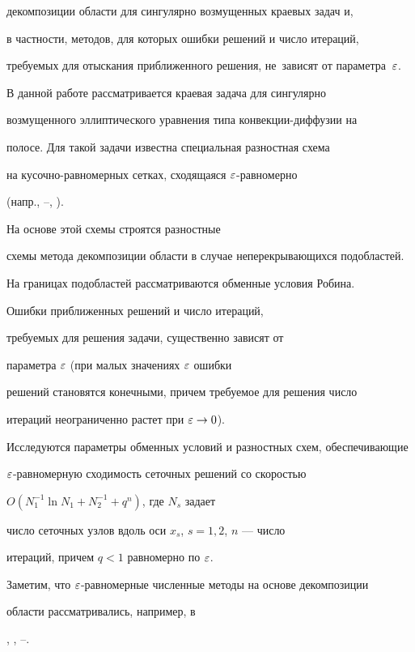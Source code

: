 декомпозиции области для сингулярно возмущенных краевых задач и,


в частности, методов, для которых ошибки решений и число итераций,


требуемых для отыскания приближенного решения, не~зависят от параметра~$\varepsilon$.





В данной работе рассматривается краевая задача для сингулярно


возмущенного эллиптического уравнения типа конвекции-диффузии на


полосе. Для такой задачи известна специальная разностная схема


на кусочно-равномерных сетках, сходящаяся $\varepsilon$-равномерно


(напр., \cite{6}--\cite{8}, \cite{CRC}).


На основе этой схемы строятся разностные


схемы метода декомпозиции области в случае неперекрывающихся подобластей.


На границах подобластей рассматриваются обменные условия Робина.


Ошибки приближенных решений и число итераций,


требуемых для решения задачи, существенно зависят от 


параметра $\varepsilon$ (при малых значениях $\varepsilon$ ошибки


решений становятся конечными, причем требуемое для решения число


итераций неограниченно растет при $\varepsilon \to 0$).





Исследуются параметры обменных условий и разностных схем, обеспечивающие


$\varepsilon$-рав\-но\-мер\-ную сходимость сеточных решений со скоростью


$O(N_1^{-1}\ln N_1 + N_2^{-1} + q^n)$, где $N_s$ задает 


число сеточных узлов вдоль оси $x_s$, $s=1,2$, $n$ --- число


итераций, причем $q < 1$ равномерно по $\varepsilon$.





Заметим, что $\varepsilon$-равномерные численные методы на основе декомпозиции


области рассматривались, например, в


\cite{6}, \cite{7}, \cite{17}--\cite{21}.


